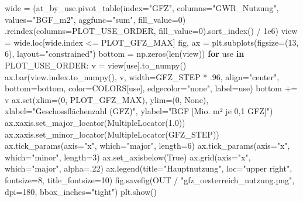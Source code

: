 \documentclass[
  ngerman,
  a4paper,
  DIV=11]{scrreprt}
\newenvironment{Shaded}{\begin{snugshade}}{\end{snugshade}}
\newcommand{\BuiltInTok}[1]{\textcolor[rgb]{0.00,0.23,0.31}{#1}}
\newcommand{\ControlFlowTok}[1]{\textcolor[rgb]{0.00,0.23,0.31}{\textbf{#1}}}
\newcommand{\DecValTok}[1]{\textcolor[rgb]{0.68,0.00,0.00}{#1}}
\newcommand{\FloatTok}[1]{\textcolor[rgb]{0.68,0.00,0.00}{#1}}
\newcommand{\KeywordTok}[1]{\textcolor[rgb]{0.00,0.23,0.31}{\textbf{#1}}}
\newcommand{\NormalTok}[1]{\textcolor[rgb]{0.00,0.23,0.31}{#1}}
\newcommand{\OperatorTok}[1]{\textcolor[rgb]{0.37,0.37,0.37}{#1}}
\newcommand{\StringTok}[1]{\textcolor[rgb]{0.13,0.47,0.30}{#1}}
\newcommand{\VariableTok}[1]{\textcolor[rgb]{0.07,0.07,0.07}{#1}}
\newcounter{none} %
\begin{document}
\begin{Shaded}
\begin{Highlighting}[]
\NormalTok{wide }\OperatorTok{=}\NormalTok{ (at\_by\_use.pivot\_table(index}\OperatorTok{=}\StringTok{"GFZ"}\NormalTok{, columns}\OperatorTok{=}\StringTok{"GWR\_Nutzung"}\NormalTok{,}
\NormalTok{           values}\OperatorTok{=}\StringTok{"BGF\_m2"}\NormalTok{, aggfunc}\OperatorTok{=}\StringTok{"sum"}\NormalTok{, fill\_value}\OperatorTok{=}\DecValTok{0}\NormalTok{)}
\NormalTok{        .reindex(columns}\OperatorTok{=}\NormalTok{PLOT\_USE\_ORDER, fill\_value}\OperatorTok{=}\DecValTok{0}\NormalTok{).sort\_index() }\OperatorTok{/} \FloatTok{1e6}\NormalTok{)}
\NormalTok{view }\OperatorTok{=}\NormalTok{ wide.loc[wide.index }\OperatorTok{\textless{}=}\NormalTok{ PLOT\_GFZ\_MAX]}
\NormalTok{fig, ax }\OperatorTok{=}\NormalTok{ plt.subplots(figsize}\OperatorTok{=}\NormalTok{(}\DecValTok{13}\NormalTok{, }\DecValTok{6}\NormalTok{), layout}\OperatorTok{=}\StringTok{"constrained"}\NormalTok{)}
\NormalTok{bottom }\OperatorTok{=}\NormalTok{ np.zeros(}\BuiltInTok{len}\NormalTok{(view))}
\ControlFlowTok{for}\NormalTok{ use }\KeywordTok{in}\NormalTok{ PLOT\_USE\_ORDER:}
\NormalTok{    v }\OperatorTok{=}\NormalTok{ view[use].to\_numpy()}
\NormalTok{    ax.bar(view.index.to\_numpy(), v, width}\OperatorTok{=}\NormalTok{GFZ\_STEP }\OperatorTok{*} \FloatTok{.96}\NormalTok{,}
\NormalTok{           align}\OperatorTok{=}\StringTok{"center"}\NormalTok{, bottom}\OperatorTok{=}\NormalTok{bottom, color}\OperatorTok{=}\NormalTok{COLORS[use],}
\NormalTok{           edgecolor}\OperatorTok{=}\StringTok{"none"}\NormalTok{, label}\OperatorTok{=}\NormalTok{use)}
\NormalTok{    bottom }\OperatorTok{+=}\NormalTok{ v}
\NormalTok{ax.}\BuiltInTok{set}\NormalTok{(xlim}\OperatorTok{=}\NormalTok{(}\DecValTok{0}\NormalTok{, PLOT\_GFZ\_MAX), ylim}\OperatorTok{=}\NormalTok{(}\DecValTok{0}\NormalTok{, }\VariableTok{None}\NormalTok{),}
\NormalTok{       xlabel}\OperatorTok{=}\StringTok{"Geschossflächenzahl (GFZ)"}\NormalTok{, ylabel}\OperatorTok{=}\StringTok{"BGF [Mio. m² je 0,1 GFZ]"}\NormalTok{)}
\NormalTok{ax.xaxis.set\_major\_locator(MultipleLocator(}\FloatTok{1.0}\NormalTok{))}
\NormalTok{ax.xaxis.set\_minor\_locator(MultipleLocator(GFZ\_STEP))}
\NormalTok{ax.tick\_params(axis}\OperatorTok{=}\StringTok{"x"}\NormalTok{, which}\OperatorTok{=}\StringTok{"major"}\NormalTok{, length}\OperatorTok{=}\DecValTok{6}\NormalTok{)}
\NormalTok{ax.tick\_params(axis}\OperatorTok{=}\StringTok{"x"}\NormalTok{, which}\OperatorTok{=}\StringTok{"minor"}\NormalTok{, length}\OperatorTok{=}\DecValTok{3}\NormalTok{)}
\NormalTok{ax.set\_axisbelow(}\VariableTok{True}\NormalTok{)}
\NormalTok{ax.grid(axis}\OperatorTok{=}\StringTok{"x"}\NormalTok{, which}\OperatorTok{=}\StringTok{"major"}\NormalTok{, alpha}\OperatorTok{=}\FloatTok{.22}\NormalTok{)}
\NormalTok{ax.legend(title}\OperatorTok{=}\StringTok{"Hauptnutzung"}\NormalTok{, loc}\OperatorTok{=}\StringTok{"upper right"}\NormalTok{, fontsize}\OperatorTok{=}\DecValTok{8}\NormalTok{, title\_fontsize}\OperatorTok{=}\DecValTok{10}\NormalTok{)}
\NormalTok{fig.savefig(OUT }\OperatorTok{/} \StringTok{"gfz\_oesterreich\_nutzung.png"}\NormalTok{, dpi}\OperatorTok{=}\DecValTok{180}\NormalTok{, bbox\_inches}\OperatorTok{=}\StringTok{"tight"}\NormalTok{)}
\NormalTok{plt.show()}


\end{Highlighting}
\end{Shaded}
\end{document}

